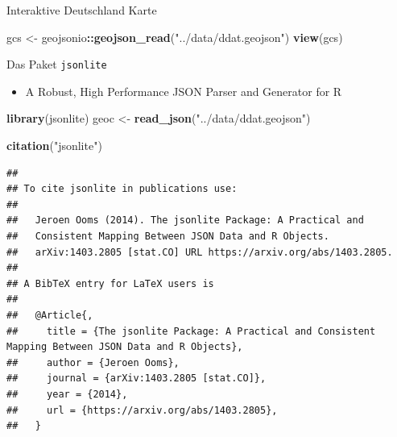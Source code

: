 \documentclass[ignorenonframetext,]{beamer}
\newenvironment{Shaded}{\begin{snugshade}}{\end{snugshade}}
\newcommand{\KeywordTok}[1]{\textcolor[rgb]{0.13,0.29,0.53}{\textbf{#1}}}
\newcommand{\StringTok}[1]{\textcolor[rgb]{0.31,0.60,0.02}{#1}}
\newcommand{\OperatorTok}[1]{\textcolor[rgb]{0.81,0.36,0.00}{\textbf{#1}}}
\newcommand{\NormalTok}[1]{#1}
\providecommand{\tightlist}{%
  \setlength{\itemsep}{0pt}\setlength{\parskip}{0pt}}
\begin{document}
\begin{frame}[fragile]{Interaktive Deutschland Karte}

\begin{Shaded}
\begin{Highlighting}[]
\NormalTok{gcs <-}\StringTok{ }\NormalTok{geojsonio}\OperatorTok{::}\KeywordTok{geojson_read}\NormalTok{(}\StringTok{"../data/ddat.geojson"}\NormalTok{)}
\KeywordTok{view}\NormalTok{(gcs)}
\end{Highlighting}
\end{Shaded}

\end{frame}

\begin{frame}[fragile]{Das Paket \texttt{jsonlite}}

\begin{itemize}
\tightlist
\item
  A Robust, High Performance JSON Parser and Generator for R
\end{itemize}

\begin{Shaded}
\begin{Highlighting}[]
\KeywordTok{library}\NormalTok{(jsonlite)}
\NormalTok{geoc <-}\StringTok{ }\KeywordTok{read_json}\NormalTok{(}\StringTok{"../data/ddat.geojson"}\NormalTok{)}
\end{Highlighting}
\end{Shaded}

\begin{Shaded}
\begin{Highlighting}[]
\KeywordTok{citation}\NormalTok{(}\StringTok{"jsonlite"}\NormalTok{)}
\end{Highlighting}
\end{Shaded}

\begin{verbatim}
## 
## To cite jsonlite in publications use:
## 
##   Jeroen Ooms (2014). The jsonlite Package: A Practical and
##   Consistent Mapping Between JSON Data and R Objects.
##   arXiv:1403.2805 [stat.CO] URL https://arxiv.org/abs/1403.2805.
## 
## A BibTeX entry for LaTeX users is
## 
##   @Article{,
##     title = {The jsonlite Package: A Practical and Consistent Mapping Between JSON Data and R Objects},
##     author = {Jeroen Ooms},
##     journal = {arXiv:1403.2805 [stat.CO]},
##     year = {2014},
##     url = {https://arxiv.org/abs/1403.2805},
##   }
\end{verbatim}

\end{frame}
\end{document}
